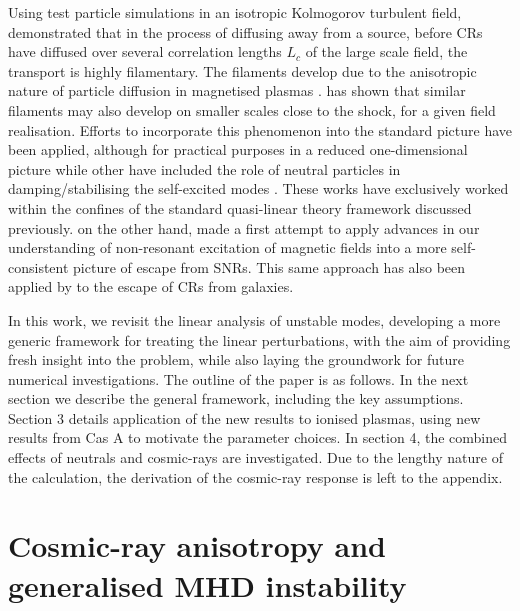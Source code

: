 \documentclass[a4paper,fleqn,usenatbib]{mnras}
\begin{document}
Using test particle simulations in an isotropic Kolmogorov turbulent field, \cite{Giacinti} demonstrated that in the process of diffusing away from a source, before CRs have diffused over several correlation lengths $L_c$ of the large scale field, the transport is highly filamentary. The filaments develop due to the anisotropic nature of particle diffusion in magnetised plasmas \cite[e.g.][]{Isenberg}. \cite{Giacalone} has shown that similar filaments may also develop on smaller scales close to the shock, for a given field realisation. Efforts to incorporate this phenomenon into the standard picture have been applied, although for practical purposes in a reduced one-dimensional picture \citep{Ptuskin,Malkovetal} while other have included the role of neutral particles in damping/stabilising the self-excited modes \citep{Nava16,DAngelo,Brahimi20}. These works have exclusively worked within the confines of the standard quasi-linear theory framework discussed previously. \cite{Bell13} on the other hand, made a first attempt to apply advances in our understanding of non-resonant excitation of magnetic fields into a more self-consistent picture of escape from SNRs. This same approach has also been applied by \citet{Blasietal} to the escape of CRs from galaxies.


In this work, we revisit the linear analysis of unstable modes, developing a more generic framework for treating the linear perturbations, with the aim of providing fresh insight into the problem, while also laying the groundwork for future numerical investigations. The outline of the paper is as follows. In the next section we describe the general framework, including the key assumptions. Section 3 details application of the new results to ionised plasmas, using new results from Cas A to motivate the parameter choices. In section 4, the combined effects of neutrals and cosmic-rays are investigated. Due to the lengthy nature of the calculation, the derivation of the cosmic-ray response is left to the appendix.

\section{Cosmic-ray anisotropy and generalised MHD instability}
\end{document}
